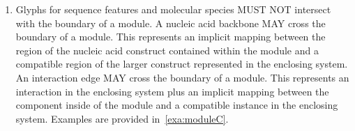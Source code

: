 {\begin{enumerate}
	\begin{figure}[h!]
	\centering
	\caption{Examples of recommended and problematic mappings: (a) mapping showing that the promoter inside the module on the left is also used in the construct on the right, (b) mapping is not visually distinct from nucleic acid backbone, (c) mapping cannot identify a promoter with a macromolecule species.}
	\label{exa:moduleB}
	\end{figure}

\item Glyphs for sequence features and molecular species MUST NOT intersect with the boundary of a module.
	A nucleic acid backbone MAY cross the boundary of a module. This represents an implicit mapping between the region of the nucleic acid construct contained within the module and a compatible region of the larger construct represented in the enclosing system.
	An interaction edge MAY cross the boundary of a module. This represents an interaction in the enclosing system plus an implicit mapping between the component inside of the module and a compatible instance in the enclosing system.
	Examples are provided in~\ref{exa:moduleC}.


\end{enumerate}}
